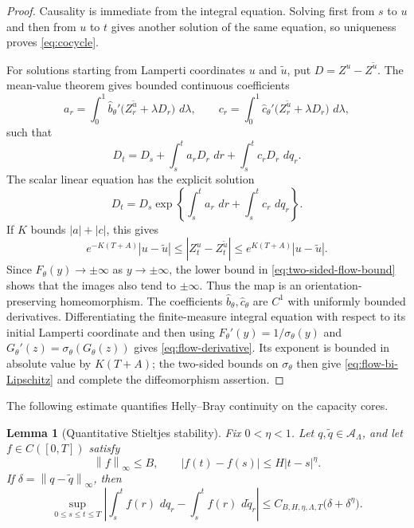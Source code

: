 \documentclass[11pt,reqno]{amsart}
\theoremstyle{plain}
\newtheorem{lemma}[lemma]{Lemma}
\theoremstyle{definition}
\newcommand{\dd}{\,d}
\newcommand{\norm}[1]{\left\lVert #1\right\rVert}
\newcommand{\abs}[1]{\left\lvert #1\right\rvert}
\begin{document}
\begin{proof}
Causality is immediate from the integral equation.  Solving first from
\(s\) to \(u\) and then from \(u\) to \(t\) gives another solution of the
same equation, so uniqueness proves \eqref{eq:cocycle}.

For solutions starting from Lamperti coordinates \(u\) and
\(\widetilde u\), put \(D=Z^u-Z^{\widetilde u}\).  The mean-value theorem
gives bounded continuous coefficients
\[
  a_r=\int_0^1
    \widehat b_\theta'
      \bigl(Z_r^{\widetilde u}+\lambda D_r\bigr)\,\dd\lambda,
  \qquad
  c_r=\int_0^1
    \widehat c_\theta'
      \bigl(Z_r^{\widetilde u}+\lambda D_r\bigr)\,\dd\lambda,
\]
such that
\[
  D_t=D_s+\int_s^t a_rD_r\,\dd r+\int_s^t c_rD_r\,\dd q_r.
\]
The scalar linear equation has the explicit solution
\[
  D_t=D_s
  \exp\!\left\{
    \int_s^t a_r\,\dd r+\int_s^t c_r\,\dd q_r
  \right\}.
\]
If \(K\) bounds \(\abs a+\abs c\), this gives
\begin{equation}\label{eq:two-sided-flow-bound}
  e^{-K(T+A)}\abs{u-\widetilde u}
  \le
  \abs{Z_t^u-Z_t^{\widetilde u}}
  \le
  e^{K(T+A)}\abs{u-\widetilde u}.
\end{equation}
Since \(F_\theta(y)\to\pm\infty\) as \(y\to\pm\infty\), the lower bound in
\eqref{eq:two-sided-flow-bound} shows that the images also tend to
\(\pm\infty\).  Thus the map is an orientation-preserving homeomorphism.
The coefficients \(\widehat b_\theta,\widehat c_\theta\) are \(C^1\) with
uniformly bounded derivatives.  Differentiating the finite-measure integral
equation with respect to its initial Lamperti coordinate and then using
\(F_\theta'(y)=1/\sigma_\theta(y)\) and
\(G_\theta'(z)=\sigma_\theta(G_\theta(z))\) gives
\eqref{eq:flow-derivative}.  Its exponent is bounded in absolute value by
\(K(T+A)\); the two-sided bounds on \(\sigma_\theta\) then give
\eqref{eq:flow-bi-Lipschitz} and complete the diffeomorphism assertion.
\end{proof}

The following estimate quantifies Helly--Bray continuity on the capacity
cores.

\begin{lemma}[Quantitative Stieltjes stability]
\label{lem:quantitative-stieltjes}
Fix \(0<\eta<1\).  Let \(q,\widetilde q\in\mathcal A_\Lambda\), and let
\(f\in C([0,T])\) satisfy
\[
  \norm{f}_\infty\le B,
  \qquad
  \abs{f(t)-f(s)}\le H\abs{t-s}^\eta.
\]
If \(\delta=\norm{q-\widetilde q}_\infty\), then
\begin{equation}\label{eq:quantitative-stieltjes}
  \sup_{0\le s\le t\le T}
  \left|
    \int_s^t f(r)\,\dd q_r
    -\int_s^t f(r)\,\dd\widetilde q_r
  \right|
  \le C_{B,H,\eta,\Lambda,T}
  \bigl(\delta+\delta^\eta\bigr).
\end{equation}
\end{lemma}
\end{document}
